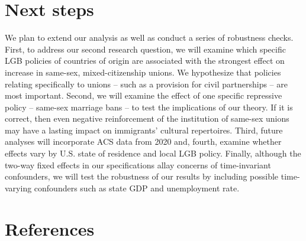\documentclass[
  12pt,
]{article}
\begin{document}
\hypertarget{next-steps}{%
\section{Next steps}\label{next-steps}}

We plan to extend our analysis as well as conduct a series of robustness checks. First, to address our second research question, we will examine which specific LGB policies of countries of origin are associated with the strongest effect on increase in same-sex, mixed-citizenship unions. We hypothesize that policies relating specifically to unions -- such as a provision for civil partnerships -- are most important. Second, we will examine the effect of one specific repressive policy -- same-sex marriage bans -- to test the implications of our theory. If it is correct, then even negative reinforcement of the institution of same-sex unions may have a lasting impact on immigrants' cultural repertoires. Third, future analyses will incorporate ACS data from 2020 and, fourth, examine whether effects vary by U.S. state of residence and local LGB policy. Finally, although the two-way fixed effects in our specifications allay concerns of time-invariant confounders, we will test the robustness of our results by including possible time-varying confounders such as state GDP and unemployment rate.

\hypertarget{references}{%
\section*{References}\label{references}}
\end{document}
